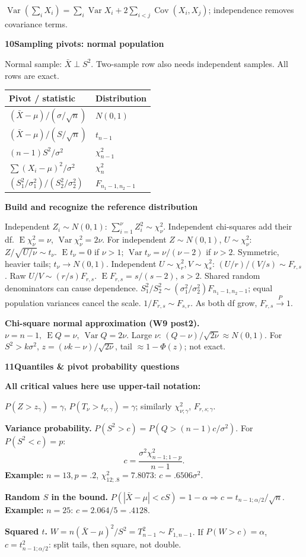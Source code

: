 \documentclass[a4paper,landscape]{article}
\newcommand{\head}[2][late]{\par\vspace{3pt}\noindent\colorbox{#1}{\parbox{\dimexpr\linewidth-6pt}{\color{white}\bfseries #2}}\par\vspace{1pt}}
\newcommand{\cue}[1]{\par\textbf{#1}\enspace}
\newcommand{\E}{\operatorname{E}}
\newcommand{\V}{\operatorname{Var}}
\newcommand{\Cov}{\operatorname{Cov}}
\newcommand{\Xb}{\bar X}
\newcommand{\col}{\par\vfill\columnbreak}
\newcommand{\tblhead}[1]{\textbf{#1}}
\newcommand{\subhead}[1]{\par\vspace{2pt}\textcolor{late}{\textbf{#1}}\par}
\begin{document}
\begin{multicols*}{4}
\(\V(\sum_iX_i)=\sum_i\V X_i+2\sum_{i<j}\Cov(X_i,X_j)\); independence removes covariance terms.
\col
\head{10\quad Sampling pivots: normal population}
Normal sample: \(\Xb\perp S^2\). Two-sample row also needs independent samples. All rows are exact.
\begin{tabular}{@{}L{.58\linewidth}L{.36\linewidth}@{}}
\tblhead{Pivot / statistic} & \tblhead{Distribution}\\\hline
\((\Xb-\mu)/(\sigma/\sqrt n)\) & \(N(0,1)\)\\
\((\Xb-\mu)/(S/\sqrt n)\) & \(t_{n-1}\)\\
\((n-1)S^2/\sigma^2\) & \(\chi^2_{n-1}\)\\
\(\sum(X_i-\mu)^2/\sigma^2\) & \(\chi^2_n\)\\
\((S_1^2/\sigma_1^2)/(S_2^2/\sigma_2^2)\) & \(F_{n_1-1,n_2-1}\)
\end{tabular}
\subhead{Build and recognize the reference distribution}
Independent \(Z_i\sim N(0,1)\): \(\sum_{i=1}^\nu Z_i^2\sim\chi^2_\nu\). Independent chi-squares add their df. \(\E\chi^2_\nu=\nu\), \(\V\chi^2_\nu=2\nu\).
For independent \(Z\sim N(0,1)\), \(U\sim\chi^2_\nu\): \(Z/\sqrt{U/\nu}\sim t_\nu\). \(\E t_\nu=0\) if \(\nu>1\); \(\V t_\nu=\nu/(\nu-2)\) if \(\nu>2\). Symmetric, heavier tails; \(t_\nu\to N(0,1)\).
Independent \(U\sim\chi^2_r,V\sim\chi^2_s\): \((U/r)/(V/s)\sim F_{r,s}\). Raw \(U/V\sim(r/s)F_{r,s}\). \(\E F_{r,s}=s/(s-2)\), \(s>2\). Shared random denominators can cause dependence.
\(S_1^2/S_2^2\sim(\sigma_1^2/\sigma_2^2)F_{n_1-1,n_2-1}\); equal population variances cancel the scale. \(1/F_{r,s}\sim F_{s,r}\). As both df grow, \(F_{r,s}\xrightarrow{P}1\).
\cue{Chi-square normal approximation (W9 post2).}
\(\nu=n-1,\ \E Q=\nu,\ \V Q=2\nu\). Large \(\nu\): \((Q-\nu)/\sqrt{2\nu}\approx N(0,1)\). For \(S^2>k\sigma^2\), \(z=(\nu k-\nu)/\sqrt{2\nu}\), tail \(\approx1-\Phi(z)\); not exact.
\head{11\quad Quantiles \& pivot probability questions}
\textbf{All critical values here use upper-tail notation:}\par
\(P(Z>z_\gamma)=\gamma\), \(P(T_\nu>t_{\nu;\gamma})=\gamma\); similarly \(\chi^2_{\nu;\gamma}\), \(F_{r,s;\gamma}\).
\cue{Variance probability.} \(P(S^2>c)=P(Q>(n-1)c/\sigma^2)\). For \(P(S^2<c)=p\):
\[c=\frac{\sigma^2\chi^2_{n-1;1-p}}{n-1}.\]
\textbf{Example:} \(n=13,p=.2\), \(\chi^2_{12;.8}=7.8073\): \(c=.6506\sigma^2\).
\cue{Random \(S\) in the bound.}
\(P(|\Xb-\mu|<cS)=1-\alpha\Rightarrow c=t_{n-1;\alpha/2}/\sqrt n\).
\textbf{Example:} \(n=25\): \(c=2.064/5=.4128\).
\cue{Squared \(t\).} \(W=n(\Xb-\mu)^2/S^2=T_{n-1}^2\sim F_{1,n-1}\). If \(P(W>c)=\alpha\), \(c=t_{n-1;\alpha/2}^2\): split tails, then square, not double.

\end{multicols*}
\end{document}
